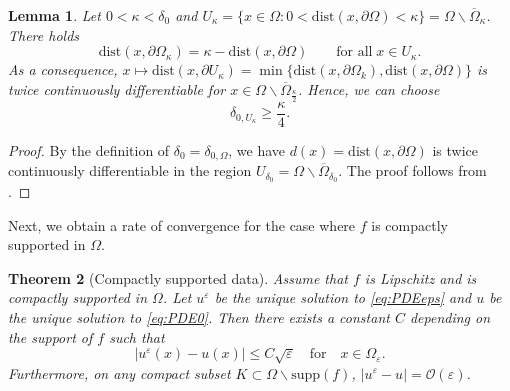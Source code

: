 \documentclass[12pt,reqno]{amsart}
\numberwithin{figure}{section}
\theoremstyle{plain}
\newtheorem{thm}{Theorem}[section]
\newtheorem{lem}[thm]{Lemma}
\theoremstyle{remark}
\numberwithin{equation}{section}
\begin{document}
\begin{lem} Let $0<\kappa < \delta_0$ and $U_\kappa = \big\{x\in \Omega: 0<\mathrm{dist}(x,\partial\Omega) < \kappa\big\} = \Omega\backslash \overline{\Omega}_\kappa$. There holds
\begin{equation*}
    \mathrm{dist}(x,\partial\Omega_\kappa) = \kappa - \mathrm{dist}(x,\partial\Omega) \qquad\text{for all}\;x\in U_\kappa.
\end{equation*}
As a consequence, $x\mapsto \mathrm{dist}(x,\partial U_\kappa) = \min\big\{\mathrm{dist}(x,\partial \Omega_k),\mathrm{dist}(x,\partial \Omega)\big\}$ is twice continuously differentiable for $x\in \Omega\backslash \overline{\Omega}_{\frac{\kappa}{2}}$. Hence, we can choose 
\begin{equation}\label{e:delta_kappa}
    \delta_{0,U_\kappa} \geq \frac{\kappa}{4}.
\end{equation}
\end{lem}
\begin{proof} By the definition of $\delta_0 = \delta_{0,\Omega}$, we have $d(x) = \mathrm{dist}(x,\partial\Omega)$ is twice continuously differentiable in the region $U_{\delta_0} = \Omega\backslash \overline{\Omega}_{\delta_0}$. The proof follows from \cite[p. 355]{gilbarg_elliptic_2001}. 
\end{proof}

Next, we obtain a rate of convergence for the case where $f$ is compactly supported in $\Omega$.

\begin{thm}[Compactly supported data]\label{thm:rate_doubling1} Assume that $f$ is Lipschitz and is compactly supported in $\Omega$. Let $u^\varepsilon$ be the unique solution to \eqref{eq:PDEeps} and $u$ be the unique solution to \eqref{eq:PDE0}. Then there exists a constant $C$ depending on the support of $f$ such that
\begin{equation*}
|u^\varepsilon(x) - u(x)| \leq C\sqrt{\varepsilon} \quad  \text{for} \quad x\in \Omega_{\varepsilon}.
\end{equation*}
Furthermore, on any compact subset $K\subset\Omega\backslash \mathrm{supp}(f)$, $|u^\varepsilon - u| = \mathcal{O}(\varepsilon)$.
\end{thm}
\end{document}
